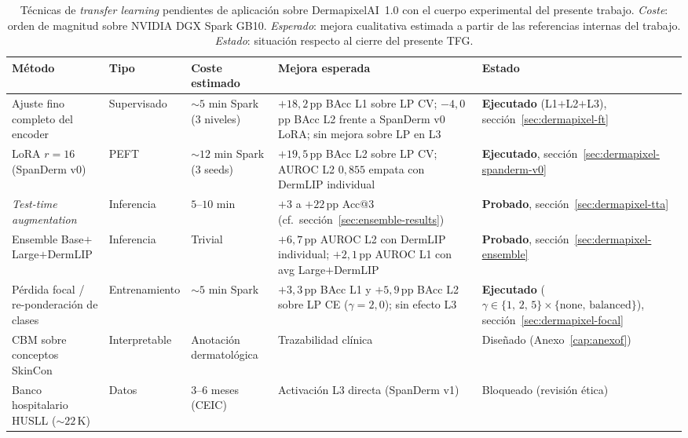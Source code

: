 \begin{table}[H]
\centering
\footnotesize
\setlength{\tabcolsep}{4pt}
\renewcommand{\arraystretch}{0.95}
\caption{Técnicas de \emph{transfer learning} pendientes de
aplicación sobre DermapixelAI~1.0 con el cuerpo experimental del
presente trabajo. \emph{Coste}: orden de magnitud sobre NVIDIA DGX
Spark GB10. \emph{Esperado}: mejora cualitativa estimada a partir
de las referencias internas del trabajo. \emph{Estado}: situación
respecto al cierre del presente TFG.}
\label{tab:dermapixel-pendiente}
\begin{tabular}{lllll}
\hline
Método & Tipo & Coste estimado & Mejora esperada & Estado \\
\hline
Ajuste fino completo del encoder        & Supervisado            & $\sim 5$ min Spark (3 niveles) & $+18{,}2$\,pp BAcc L1 sobre LP CV; $-4{,}0$\,pp BAcc L2 frente a SpanDerm v0 LoRA; sin mejora sobre LP en L3 & \textbf{Ejecutado} (L1$+$L2$+$L3), secci\'on~\ref{sec:dermapixel-ft} \\
LoRA $r=16$ (SpanDerm v0)               & PEFT                   & $\sim 12$ min Spark (3 seeds) & $+19{,}5$\,pp BAcc L2 sobre LP CV; AUROC L2 $0{,}855$ empata con DermLIP individual & \textbf{Ejecutado}, secci\'on~\ref{sec:dermapixel-spanderm-v0} \\
\emph{Test-time augmentation}           & Inferencia             & $5$--$10$ min              & $+3$ a $+22$\,pp Acc@3 (cf.\ secci\'on~\ref{sec:ensemble-results}) & \textbf{Probado}, secci\'on~\ref{sec:dermapixel-tta} \\
Ensemble Base$+$Large$+$DermLIP         & Inferencia             & Trivial                    & $+6{,}7$\,pp AUROC L2 con DermLIP individual; $+2{,}1$\,pp AUROC L1 con avg Large$+$DermLIP & \textbf{Probado}, secci\'on~\ref{sec:dermapixel-ensemble} \\
Pérdida focal / re-ponderación de clases & Entrenamiento         & $\sim 5$ min Spark         & $+3{,}3$\,pp BAcc L1 y $+5{,}9$\,pp BAcc L2 sobre LP CE ($\gamma = 2{,}0$); sin efecto L3 & \textbf{Ejecutado} ($\gamma \in \{1,\,2,\,5\} \times \{\text{none},\,\text{balanced}\}$), secci\'on~\ref{sec:dermapixel-focal} \\
CBM sobre conceptos SkinCon              & Interpretable          & Anotación dermatológica    & Trazabilidad clínica                                          & Diseñado (Anexo~\ref{cap:anexof}) \\
Banco hospitalario HUSLL ($\sim 22$\,K) & Datos                  & $3$--$6$ meses (CEIC)      & Activación L3 directa (SpanDerm v1)                           & Bloqueado (revisión ética) \\
\hline
\end{tabular}
\end{table}

